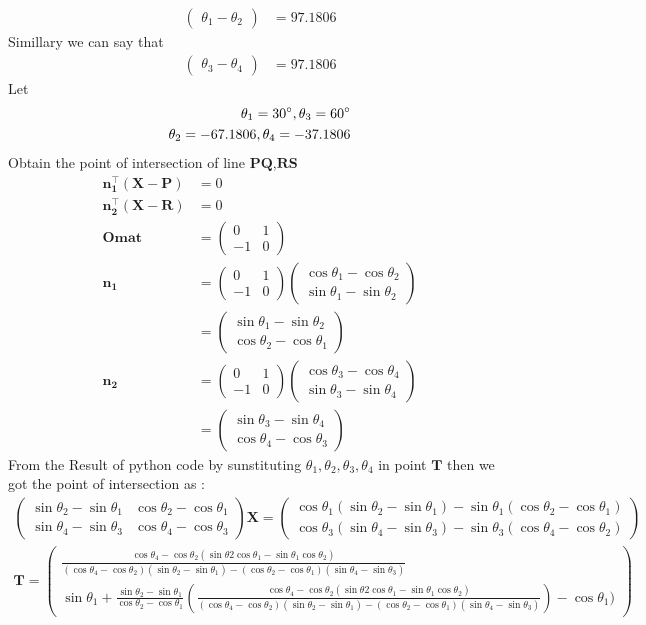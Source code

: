 \documentclass[12pt]{article}
\newcommand{\myvec}[1]{\ensuremath{\begin{pmatrix}#1\end{pmatrix}}}
\let\vec\mathbf
\begin{document}
\begin{align}
	\myvec{{\theta_1}-{\theta_2}}&=97.1806
	\end{align}
Simillary we can say that
\begin{align}
	\myvec{{\theta_3}-{\theta_4}}&=97.1806 		       
\end{align}	
Let
\begin{align}
{\theta_1=30\degree},{\theta_3=60\degree}\\
{\theta_2=-67.1806},{\theta_4=-37.1806}
\end{align}
Obtain the point of intersection of line $\vec{PQ}$,$\vec{RS}$
\begin{align}
\vec{n_1^{\top}}(\vec{X}-\vec{P})&=0\\
\vec{n_2^{\top}}(\vec{X}-\vec{R})&=0\\
\vec{Omat}&=\myvec{0&1\\-1&0}\\
\vec{n_1}&=\myvec{0&1\\-1&0}\myvec{\cos{\theta_1}-\cos{\theta_2}\\\sin{\theta_1}-\sin{\theta_2}}\\
&=\myvec{\sin{\theta_1}-\sin{\theta_2}\\\cos{\theta_2}-\cos{\theta_1}}\\
\vec{n_2}&=\myvec{0&1\\-1&0}\myvec{\cos{\theta_3}-\cos{\theta_4}\\\sin{\theta_3}-\sin{\theta_4}}\\
&=\myvec{\sin{\theta_3}-\sin{\theta_4}\\\cos{\theta_4}-\cos{\theta_3}}
\end{align}
From the Result of python code by sunstituting $\theta_1,\theta_2,\theta_3,\theta_4$ in point $\vec{T}$ then we got the point of intersection as :
\begin{align}
\myvec{\sin{\theta_2}-\sin{\theta_1}&\cos{\theta_2}-\cos{\theta_1}\\\sin{\theta_4}-\sin{\theta_3}&\cos{\theta_4}-\cos{\theta_3}}\vec{X}=\myvec{\cos{\theta_1}(\sin{\theta_2}-\sin{\theta_1})-\sin{\theta_1}(\cos{\theta_2}-\cos{\theta_1})\\\cos\theta_3(\sin\theta_4-\sin\theta_3)-\sin\theta_3(\cos\theta_4-\cos\theta_2)}\\
\vec{T}=\myvec{\frac{\cos{\theta_4}-\cos{\theta_2}(\sin{\theta2}\cos{\theta_1}-\sin{\theta_1}\cos{\theta_2})}{(\cos{\theta_4}-\cos{\theta_2})(\sin{\theta_2}-\sin{\theta_1})-(\cos{\theta_2}-\cos{\theta_1})(\sin{\theta_4}-\sin{\theta_3})}\\[8pt]\sin{\theta_1}+\frac{\sin{\theta_2}-\sin{\theta_1}}{\cos{\theta_2}-\cos{\theta_1}}(\frac{\cos{\theta_4}-\cos{\theta_2}(\sin{\theta2}\cos{\theta_1}-\sin{\theta_1}\cos{\theta_2})}{(\cos{\theta_4}-\cos{\theta_2})(\sin{\theta_2}-\sin{\theta_1})-(\cos{\theta_2}-\cos{\theta_1})(\sin{\theta_4}-\sin{\theta_3})})-\cos{\theta_1})}
\end{align}
\end{document}
